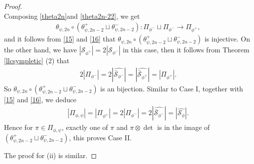\documentclass[article]{article}
\numberwithin{equation}{section}
\theoremstyle{definition}
\begin{document}
\begin{proof}
\begin{equation}
		\end{equation}
		Composing \ref{theta2n}and \ref{theta2n-22}, we get 
		\begin{align*}
		\theta_{\psi,2n}\circ(\theta_{\psi,2n-2}^{+}\sqcup\theta_{\psi,2n-2}^{-}): \Pi_{\phi^{-}}\sqcup \Pi_{\phi^{-}} \longrightarrow \Pi_{\phi^{+}},
		\end{align*}
		and it follows from \ref{15} and \ref{16} that $\theta_{\psi,2n}\circ (\theta_{\psi,2n-2}^{+}\sqcup\theta_{\psi,2n-2}^{-})$ is injective. On the other hand, we have $|\mathcal S_{\phi^{+}}|=2|\mathcal S_{\phi^{-}}|$ in this case, then it follows from Theorem \ref{llcsympletic} (2) that 
		\begin{align}
		2|\Pi_{\phi^{-}}|=2|\widehat{\bar {\mathcal S}_{\phi^-}}|=|\widehat{\bar {\mathcal S}_{\phi^+}}|=|\Pi_{\phi^{+}}|. 
		\end{align}
		So $\theta_{\psi,2n}\circ (\theta_{\psi,2n-2}^{+}\sqcup\theta_{\psi,2n-2}^{-})$ is an bijection. Similar to Case I, together with \ref{15} and \ref{16}, we deduce  
		\begin{align*}
		|\Pi_{\phi,\psi}|=|\Pi_{\phi^{+}}|=  2|\Pi_{\phi^{-}}|=2|\widehat{\bar {\mathcal S}_{\phi^{-}}}|=|\widehat{\mathcal {S}_{\phi}}|. 
		\end{align*}
	Hence for $\pi\in \Pi_{\phi,\psi}$, exactly one of $\pi$ and $\pi\otimes\det$ is in the image of $(\theta_{\psi,2n-2}^{+}\sqcup\theta_{\psi,2n-2}^{-})$, this proves Case II.

	The proof for (ii) is similar.
\end{proof}
\end{document}
